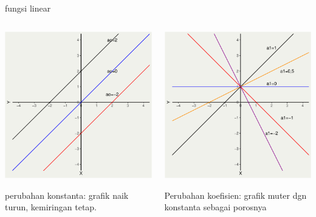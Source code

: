 \documentclass[
  ignorenonframetext,
]{beamer}
\begin{document}
\begin{frame}{fungsi linear}
\label{fungsi-linear-2}
\begin{columns}[T]
\begin{column}{0.47\textwidth}
\includegraphics{index_files/figure-beamer/unnamed-chunk-6-1.pdf}

perubahan konstanta: grafik naik turun, kemiringan tetap.
\end{column}

\begin{column}{0.47\textwidth}
\includegraphics{index_files/figure-beamer/unnamed-chunk-7-1.pdf}

Perubahan koefisien: grafik muter dgn konstanta sebagai porosnya
\end{column}
\end{columns}
\end{frame}
\end{document}

